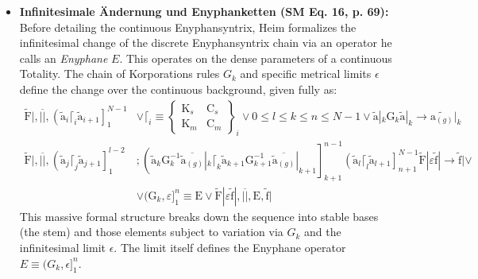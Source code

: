 \documentclass[12pt]{article}
\begin{document}
\begin{itemize}
    \item \textbf{Infinitesimale Ändernung und Enyphanketten (SM Eq. 16, p. 69):}
    Before detailing the continuous Enyphansyntrix, Heim formalizes the infinitesimal change of the discrete Enyphansyntrix chain via an operator he calls an \textit{Enyphane} $E$. This operates on the dense parameters of a continuous Totality. The chain of Korporations rules $G_k$ and specific metrical limits $\epsilon$ define the change over the continuous background, given fully as:
    \begin{align}
    \tilde{\mathrm{F}}|, \overline{||}, \left( \tilde{\mathrm{a}}_i \lceil_i \tilde{\mathrm{a}}_{i+1} \right]_{1}^{N-1} &\lor \lceil_i \equiv \left\{ \begin{smallmatrix} \mathrm{K}_s & \mathrm{C}_s \\ \mathrm{K}_m & \mathrm{C}_m \end{smallmatrix} \right\}_i \lor 0 \le l \le k \le n \le N-1 \lor \tilde{\mathrm{a}}|_k \mathrm{G}_k \tilde{\mathrm{a}}|_k \to \widetilde{\mathrm{a}_{(g)}}|_k \nonumber \\
    \tilde{\mathrm{F}}|, \overline{||}, \left( \tilde{\mathrm{a}}_j \lceil_j \tilde{\mathrm{a}}_{j+1} \right]_{1}^{l-2} &; \left( \tilde{\mathrm{a}}_k \mathrm{G}_k^{-1} \overline{\tilde{\mathrm{a}}_{(g)}}|_k \lceil_k \tilde{\mathrm{a}}_{k+1} \mathrm{G}_{k+1}^{-1} \overline{\tilde{\mathrm{a}}_{(g)}}|_{k+1} \right]_{k+1}^{n-1} \left( \tilde{\mathrm{a}}_l \lceil_l \tilde{\mathrm{a}}_{l+1} \right]_{n+1}^{N-1} \tilde{\mathrm{F}}| \varepsilon \tilde{\mathrm{f}}| \to \tilde{\mathrm{f}}| \lor \nonumber \\
    &\lor (\mathrm{G}_k, \varepsilon]_1^n \equiv \mathrm{E} \lor \tilde{\mathrm{F}}| \varepsilon \tilde{\mathrm{f}}|, \overline{||}, \mathrm{E}, \tilde{\mathrm{f}}|
    \label{eq:original_enyphankette_16}
\end{align}
    This massive formal structure breaks down the sequence into stable bases (the stem) and those elements subject to variation via $G_k$ and the infinitesimal limit $\epsilon$. The limit itself defines the Enyphane operator $E \equiv (G_k, \epsilon]_1^n$.


\end{itemize}
\end{document}
